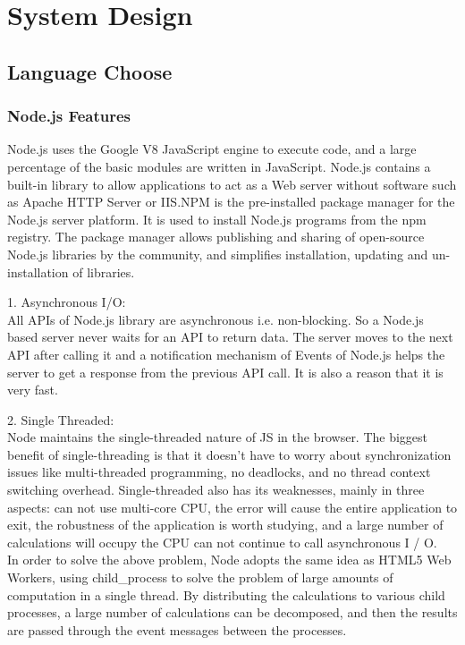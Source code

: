 
\chapter{System Design}

\section{Language Choose}
\subsection{Node.js Features}
Node.js uses the Google V8 JavaScript engine to execute code, and a large percentage of the basic modules are written in JavaScript. Node.js contains a built-in library to allow applications to act as a Web server without software such as Apache HTTP Server or IIS.NPM is the pre-installed package manager for the Node.js server platform. It is used to install Node.js programs from the npm registry.  The package manager allows publishing and sharing of open-source Node.js libraries by the community, and simplifies installation, updating and un-installation of libraries. \\
\item 1. Asynchronous I/O: \\ All APIs of Node.js library are asynchronous i.e. non-blocking. So a Node.js based server never waits for an API to return data. The server moves to the next API after calling it and a notification mechanism of Events of Node.js helps the server to get a response from the previous API call. It is also a reason that it is very fast. \\
\item 2. Single Threaded: \\ Node maintains the single-threaded nature of JS in the browser. The biggest benefit of single-threading is that it doesn't have to worry about synchronization issues like multi-threaded programming, no deadlocks, and no thread context switching overhead. Single-threaded also has its weaknesses, mainly in three aspects: can not use multi-core CPU, the error will cause the entire application to exit, the robustness of the application is worth studying, and  a large number of calculations will occupy the CPU can not continue to call asynchronous I / O. \\ In order to solve the above problem, Node adopts the same idea as HTML5 Web Workers, using child\_process to solve the problem of large amounts of computation in a single thread. By distributing the calculations to various child processes, a large number of calculations can be decomposed, and then the results are passed through the event messages between the processes.
